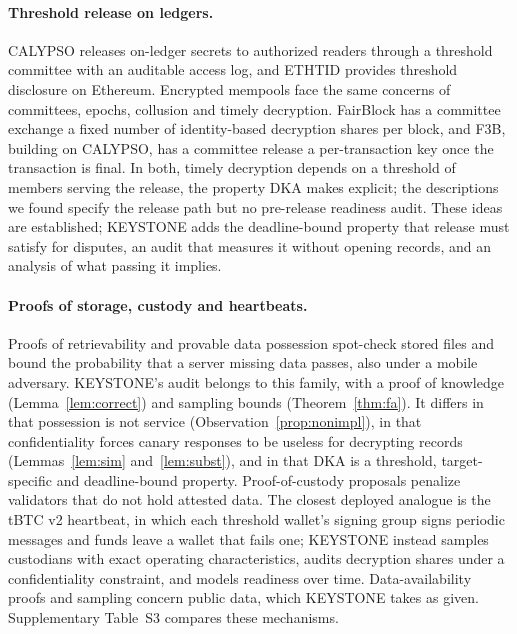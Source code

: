 \documentclass[Crown,sagev]{sagej}
\theoremstyle{plain}
\theoremstyle{definition}
\theoremstyle{remark}
\begin{document}
\paragraph{Threshold release on ledgers.} CALYPSO releases on-ledger secrets to authorized readers through a threshold committee with an auditable access log\cite{kokoriskogias2020calypso}, and ETHTID provides threshold disclosure on Ethereum\cite{stengele2021ethtid}. Encrypted mempools face the same concerns of committees, epochs, collusion and timely decryption\cite{bebel2022ferveo,choudhuri2024mempool}. FairBlock has a committee exchange a fixed number of identity-based decryption shares per block\cite{momeni2023fairblock}, and F3B, building on CALYPSO, has a committee release a per-transaction key once the transaction is final\cite{zhang2023f3b}. In both, timely decryption depends on a threshold of members serving the release, the property DKA makes explicit; the descriptions we found specify the release path but no pre-release readiness audit. These ideas are established; KEYSTONE adds the deadline-bound property that release must satisfy for disputes, an audit that measures it without opening records, and an analysis of what passing it implies.

\paragraph{Proofs of storage, custody and heartbeats.} Proofs of retrievability and provable data possession spot-check stored files and bound the probability that a server missing data passes\cite{juels2007por,ateniese2007pdp}, also under a mobile adversary\cite{bowers2009hail}. KEYSTONE's audit belongs to this family, with a proof of knowledge (Lemma~\ref{lem:correct}) and sampling bounds (Theorem~\ref{thm:fa}). It differs in that possession is not service (Observation~\ref{prop:nonimpl}), in that confidentiality forces canary responses to be useless for decrypting records (Lemmas~\ref{lem:sim} and~\ref{lem:subst}), and in that DKA is a threshold, target-specific and deadline-bound property. Proof-of-custody proposals penalize validators that do not hold attested data\cite{feist2021custody}. The closest deployed analogue is the tBTC v2 heartbeat, in which each threshold wallet's signing group signs periodic messages and funds leave a wallet that fails one\cite{tbtc2026heartbeat}; KEYSTONE instead samples custodians with exact operating characteristics, audits decryption shares under a confidentiality constraint, and models readiness over time. Data-availability proofs and sampling\cite{albassam2021fraud,hallandersen2025das} concern public data, which KEYSTONE takes as given. Supplementary Table~S3 compares these mechanisms.
\end{document}
